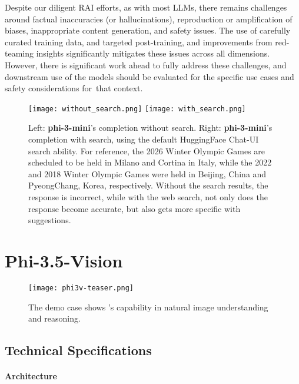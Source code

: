 Despite our diligent RAI efforts, as with most LLMs, there remains challenges around factual inaccuracies (or hallucinations), reproduction or amplification of biases, inappropriate content generation, and safety issues. The use of carefully curated training data, and targeted post-training, and improvements from red-teaming insights significantly mitigates these issues across all dimensions. However, there is significant work ahead to fully  address these challenges, and downstream use of the models should be evaluated for the specific use cases and safety considerations for that context.

\begin{figure}
    \centering
    \texttt{[image: without\_search.png]}    \texttt{[image: with\_search.png]}
    \caption{Left: \textbf{phi-3-mini}'s completion without search. Right: \textbf{phi-3-mini}'s completion with search, using the default HuggingFace Chat-UI search ability. For reference, the 2026 Winter Olympic Games are scheduled to be held in Milano and Cortina in Italy, while the 2022 and 2018 Winter Olympic Games were held in Beijing, China and PyeongChang, Korea, respectively. Without the search results, the response is incorrect, while with the web search, not only does the response become accurate, but also gets more specific with suggestions.}
    \label{fig:search}
\end{figure}

\section{Phi-3.5-Vision}
\begin{figure}[h]
    \centering
    \texttt{[image: phi3v-teaser.png]}
    \caption{The demo case shows \phivision's capability in natural image understanding and reasoning.}
    \label{fig:v-safety-pt}
\end{figure}

\subsection{Technical Specifications}

\paragraph{Architecture}

